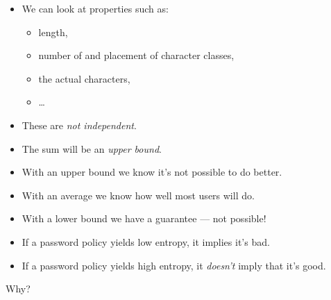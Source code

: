 \begin{frame}
  \begin{example}
    \begin{itemize}
      \item We can look at properties such as:
        \begin{itemize}
          \item length,
          \item number of and placement of character classes,
          \item the actual characters,
          \item \dots
        \end{itemize}
    \end{itemize}
  \end{example}

  \pause{}

  \begin{remark}
    \begin{itemize}
      \item These are \emph{not independent}.
      \item The sum will be an \emph{upper bound}.
    \end{itemize}
  \end{remark}
\end{frame}

\begin{frame}
  \begin{remark}
    \begin{itemize}
      \item With an upper bound we know it's not possible to do better.
      \item With an average we know how well most users will do.
      \item With a lower bound we have a guarantee --- not possible!
    \end{itemize}
  \end{remark}
\end{frame}

\begin{frame}
  \begin{remark}
    \begin{itemize}
      \item If a password policy yields low entropy, it implies it's bad.
      \item If a password policy yields high entropy, it \emph{doesn't} imply 
        that it's good.
    \end{itemize}
  \end{remark}

  \pause

  \begin{exercise}
    Why?
  \end{exercise}
\end{frame}

